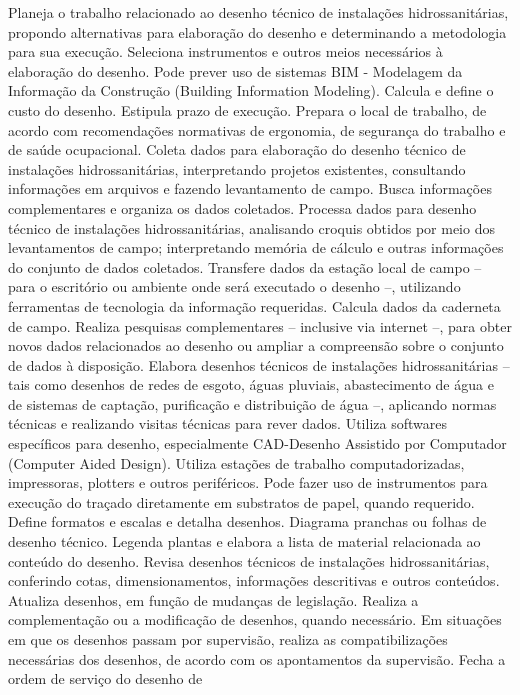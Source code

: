 \documentclass[
]{article}
\begin{document}
Planeja o trabalho relacionado ao desenho técnico de instalações
hidrossanitárias, propondo alternativas para elaboração do desenho e
determinando a metodologia para sua execução. Seleciona instrumentos e
outros meios necessários à elaboração do desenho. Pode prever uso de
sistemas BIM - Modelagem da Informação da Construção (Building
Information Modeling). Calcula e define o custo do desenho. Estipula
prazo de execução. Prepara o local de trabalho, de acordo com
recomendações normativas de ergonomia, de segurança do trabalho e de
saúde ocupacional. Coleta dados para elaboração do desenho técnico de
instalações hidrossanitárias, interpretando projetos existentes,
consultando informações em arquivos e fazendo levantamento de campo.
Busca informações complementares e organiza os dados coletados. Processa
dados para desenho técnico de instalações hidrossanitárias, analisando
croquis obtidos por meio dos levantamentos de campo; interpretando
memória de cálculo e outras informações do conjunto de dados coletados.
Transfere dados da estação local de campo -- para o escritório ou
ambiente onde será executado o desenho --, utilizando ferramentas de
tecnologia da informação requeridas. Calcula dados da caderneta de
campo. Realiza pesquisas complementares -- inclusive via internet --,
para obter novos dados relacionados ao desenho ou ampliar a compreensão
sobre o conjunto de dados à disposição. Elabora desenhos técnicos de
instalações hidrossanitárias -- tais como desenhos de redes de esgoto,
águas pluviais, abastecimento de água e de sistemas de captação,
purificação e distribuição de água --, aplicando normas técnicas e
realizando visitas técnicas para rever dados. Utiliza softwares
específicos para desenho, especialmente CAD-Desenho Assistido por
Computador (Computer Aided Design). Utiliza estações de trabalho
computadorizadas, impressoras, plotters e outros periféricos. Pode fazer
uso de instrumentos para execução do traçado diretamente em substratos
de papel, quando requerido. Define formatos e escalas e detalha
desenhos. Diagrama pranchas ou folhas de desenho técnico. Legenda
plantas e elabora a lista de material relacionada ao conteúdo do
desenho. Revisa desenhos técnicos de instalações hidrossanitárias,
conferindo cotas, dimensionamentos, informações descritivas e outros
conteúdos. Atualiza desenhos, em função de mudanças de legislação.
Realiza a complementação ou a modificação de desenhos, quando
necessário. Em situações em que os desenhos passam por supervisão,
realiza as compatibilizações necessárias dos desenhos, de acordo com os
apontamentos da supervisão. Fecha a ordem de serviço do desenho de
\end{document}
